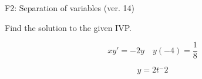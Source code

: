 \begin{exercise}
  \begin{exerciseTitle}F2: Separation of variables (ver. 14)\end{exerciseTitle}
  \begin{exerciseStatement}
    
Find the solution to the given IVP.

    
\[xy'= -2 y \hspace{1em} y( -4 ) = \frac{1}{8}\]

  \end{exerciseStatement}
  \begin{exerciseAnswer}
    
\[y= 2 t^ -2\]

  \end{exerciseAnswer}
\end{exercise}